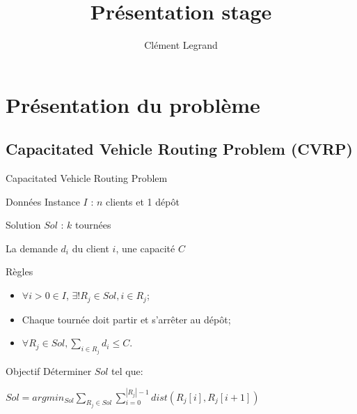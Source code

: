 \documentclass{beamer}
\title{Présentation stage}
\author{Clément Legrand}
\begin{document}
\begin{frame}[plain]
\titlepage
\end{frame}

\section{Présentation du problème}

\subsection{Capacitated Vehicle Routing Problem (CVRP)}

\begin{frame}{Capacitated Vehicle Routing Problem}
\begin{block}{Données}
Instance $I$ : $n$ clients et 1 dépôt

Solution $Sol$ : $k$ tournées

La demande $d_i$ du client $i$, une capacité $C$
\end{block}
\begin{block}{Règles}
\begin{itemize}
\item $\forall i > 0 \in I$, $\exists! R_j \in Sol, i \in R_j$;
\item Chaque tournée doit partir et s'arrêter au dépôt;
\item $ \forall R_j \in Sol, \sum_{i \in R_j} d_i \leq C$.
\end{itemize}
\end{block}
\begin{block}{Objectif}
Déterminer $Sol$ tel que:

\centering
$ Sol = argmin_{Sol} \sum_{R_j \in Sol} \sum_{i = 0}^{|R_j|-1} dist(R_j[i],R_j[i+1])$
\end{block}
\end{frame}
\end{document}
